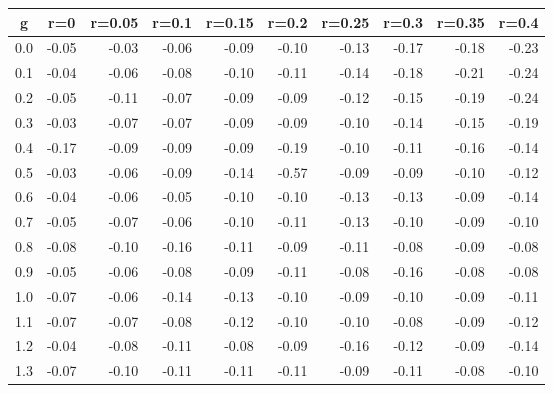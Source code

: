%
\begin{table}[!tbp]
 \begin{center}
 \begin{tabular}{rrrrrrrrrr}\hline\hline
\multicolumn{1}{c}{g}&\multicolumn{1}{c}{r=0}&\multicolumn{1}{c}{r=0.05}&\multicolumn{1}{c}{r=0.1}&\multicolumn{1}{c}{r=0.15}&\multicolumn{1}{c}{r=0.2}&\multicolumn{1}{c}{r=0.25}&\multicolumn{1}{c}{r=0.3}&\multicolumn{1}{c}{r=0.35}&\multicolumn{1}{c}{r=0.4}\tabularnewline
\hline
0.0&-0.05&-0.03&-0.06&-0.09&-0.10&-0.13&-0.17&-0.18&-0.23\tabularnewline
0.1&-0.04&-0.06&-0.08&-0.10&-0.11&-0.14&-0.18&-0.21&-0.24\tabularnewline
0.2&-0.05&-0.11&-0.07&-0.09&-0.09&-0.12&-0.15&-0.19&-0.24\tabularnewline
0.3&-0.03&-0.07&-0.07&-0.09&-0.09&-0.10&-0.14&-0.15&-0.19\tabularnewline
0.4&-0.17&-0.09&-0.09&-0.09&-0.19&-0.10&-0.11&-0.16&-0.14\tabularnewline
0.5&-0.03&-0.06&-0.09&-0.14&-0.57&-0.09&-0.09&-0.10&-0.12\tabularnewline
0.6&-0.04&-0.06&-0.05&-0.10&-0.10&-0.13&-0.13&-0.09&-0.14\tabularnewline
0.7&-0.05&-0.07&-0.06&-0.10&-0.11&-0.13&-0.10&-0.09&-0.10\tabularnewline
0.8&-0.08&-0.10&-0.16&-0.11&-0.09&-0.11&-0.08&-0.09&-0.08\tabularnewline
0.9&-0.05&-0.06&-0.08&-0.09&-0.11&-0.08&-0.16&-0.08&-0.08\tabularnewline
1.0&-0.07&-0.06&-0.14&-0.13&-0.10&-0.09&-0.10&-0.09&-0.11\tabularnewline
1.1&-0.07&-0.07&-0.08&-0.12&-0.10&-0.10&-0.08&-0.09&-0.12\tabularnewline
1.2&-0.04&-0.08&-0.11&-0.08&-0.09&-0.16&-0.12&-0.09&-0.14\tabularnewline
1.3&-0.07&-0.10&-0.11&-0.11&-0.11&-0.09&-0.11&-0.08&-0.10\tabularnewline
\hline
\end{tabular}

\end{center}

\end{table}

